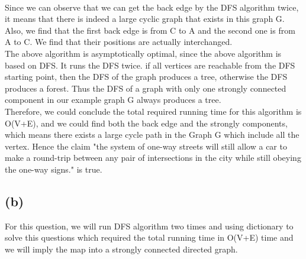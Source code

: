 \documentclass{article}
\begin{document}
\begin{center}
\end{center}
\\

\noindent Since we can observe that we can get the back edge by the DFS algorithm twice, it means that there is indeed a large cyclic graph that exists in this graph G. Also, we find that the first back edge is from C to A and the second one is from A to C. We find that their positions are actually interchanged. \\

\noindent The above algorithm is asymptotically optimal, since the above algorithm is based on DFS. It runs the DFS twice. if all vertices are reachable from the DFS starting point, then the DFS of the graph produces a tree, otherwise the DFS produces a forest. Thus the DFS of a graph with only one strongly connected component in our example graph G always produces a tree.\\

\noindent Therefore, we could conclude the total required running time for this algorithm is O(V+E), and we could find both the back edge and the strongly components, which means there exists a large cycle path in the Graph G which include all the vertex. Hence the claim "the system of one-way streets will still allow a car to make a round-trip between any pair of intersections in the city while still obeying the one-way signs." is true.\\
\subsection*{(b)} 
For this question, we will run DFS algorithm two times and using dictionary to solve this questions which required the total running time in O(V+E) time and we will imply the map into a strongly connected directed graph.\\
\end{document}
